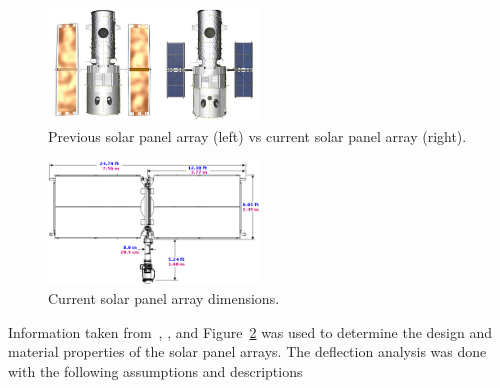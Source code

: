 \documentclass[paper=letter, fontsize=11pt]{scrartcl} %
\numberwithin{equation}{section} %
\numberwithin{figure}{section} %
\numberwithin{table}{section} %
\begin{document}
\begin{figure}[H]
    \begin{center}
        \includegraphics[width=0.5\textwidth]{Pics/10.png}
        \caption{Previous solar panel array (left) vs current solar panel array (right).}
        \label{fig:p10}
    \end{center}
\end{figure}

\begin{figure}[H]
    \begin{center}
        \includegraphics[width=0.5\textwidth]{Pics/11.png}
        \caption{Current solar panel array dimensions.}
        \label{fig:p11}
    \end{center}
\end{figure}

Information taken from~\cite{csm}, \cite{mech3}, and Figure~\ref{fig:p11} was used to determine the design and material properties of the solar panel arrays. The deflection analysis was done with the following assumptions and descriptions
\end{document}
